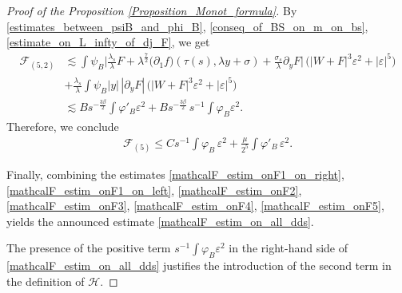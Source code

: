 \documentclass[16pt,english, oneside,reqno]{smfart}
\newcommand{\vare}{{\varepsilon}}
\newcommand{\vphi}{{\varphi}}
\begin{document}
\begin{proof}[Proof of the Proposition \ref{Proposition_Monot_formula}]
By \eqref{estimates_between_psiB_and_phi_B}, \eqref{conseq_of_BS_on_m_on_bs}, \eqref{estimate_on_L_infty_of_dj_F}, we get
\begin{equation}
\begin{split}
    \mathcal{F}_{(5,2)} & \lesssim \int \psi_B  \Big| \frac{\lambda_s}{\lambda}F + \lambda^{\frac{7}{2}} \big(\partial_1 f \big)(\tau(s), \lambda y +\sigma)+ \frac{\sigma_s}{\lambda} \partial_y F \Big|\, \big(|W+F|^3\vare^2 + |\vare|^5 \big)\\
    & + \frac{\lambda_s}{\lambda}\int \psi_B |y|\, |\partial_y F|\, \big(|W+F|^3\vare^2 + |\vare|^5 \big)\\
    & \lesssim
    B s^{-\frac{3\beta}{2}}\int \vphi'_B \vare^2 + Bs^{-\frac{3\beta}{2}} \,s^{-1}\int \vphi_B \vare^2.
\end{split}
\end{equation}
Therefore, we conclude
\begin{equation}\label{mathcalF_estim_onF5}
    \begin{split}
        \mathcal{F}_{(5)} \leq Cs^{-1}\int \vphi_B\,\vare^2 + \frac{\mu}{2^{5}}\int \vphi'_B\,\vare^2.
    \end{split}
\end{equation}

\vspace{0.4cm}
Finally, combining the estimates \eqref{mathcalF_estim_onF1_on_right}, \eqref{mathcalF_estim_onF1_on_left}, \eqref{mathcalF_estim_onF2}, \eqref{mathcalF_estim_onF3}, \eqref{mathcalF_estim_onF4}, \eqref{mathcalF_estim_onF5}, yields the announced estimate \eqref{mathcalF_estim_on_all_dds}.

The presence of the positive term $s^{-1}\int \varphi_B \vare^2$ in the right-hand side
of \eqref{mathcalF_estim_on_all_dds} justifies the introduction of the second
term in the definition of $\mathcal{H}$.


\end{proof}
\end{document}
